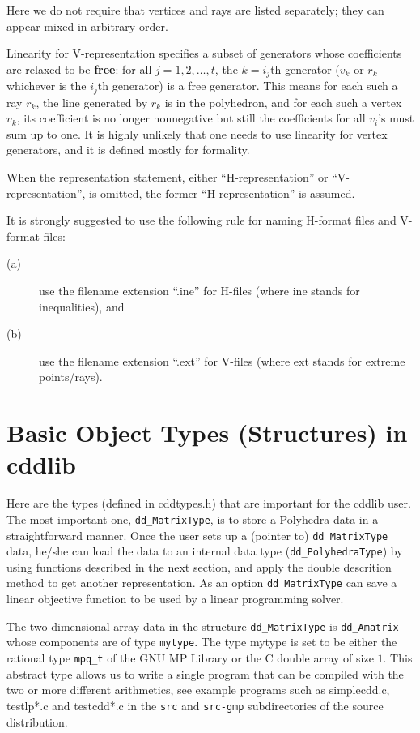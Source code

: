 \documentclass[11pt]{article}
\newcommand {\0} {{\bf 0}}
\begin{document}
\bigskip
\noindent
Here we do not require that
vertices and rays are listed
separately; they can appear mixed in arbitrary
order.

Linearity for V-representation specifies a subset of generators
whose coefficients are relaxed
to be {\bf free}:  for all $j=1,2, \ldots, t$, the $k=i_j$th generator ($v_{k}$ or $r_k$ whichever is the $i_j$th generator) is a free generator.
This means for each such a ray $r_k$,
the line generated by $r_k$ is in the polyhedron,
and for each such a vertex $v_k$, its coefficient is no longer nonnegative
but still the coefficients for all $v_i$'s must sum up to one.
It is highly unlikely that one needs to
use linearity for vertex generators, and it is defined mostly
for formality.

When the representation statement, either ``H-representation''
or ``V-representation'', is omitted, the former
``H-representation'' is assumed.

It is strongly suggested to use the following rule for naming
H-format files and V-format files:
\begin{description}
\item[(a)] use the filename  extension ``.ine'' for H-files (where ine stands for inequalities), and
\item[(b)]  use the filename  extension ``.ext'' for V-files (where ext stands for extreme points/rays).
\end{description}


\section{Basic Object Types (Structures) in cddlib}  \label{DATASTR}

Here are the types (defined in cddtypes.h) that are
important for the cddlib user.  The most important one,
{\tt dd\_MatrixType},
is to store a Polyhedra data in a straightforward manner.
Once the user sets up a (pointer to)  {\tt dd\_MatrixType} data,
he/she can load the data to an internal data type ({\tt dd\_PolyhedraType})
by using functions described in the next section, and apply
the double descrition method to get another representation.
As an option  {\tt dd\_MatrixType} can save a linear objective function
to be used by a linear programming solver.

The two dimensional array data in the structure {\tt dd\_MatrixType} is
{\tt dd\_Amatrix} whose components are of type {\tt mytype\/}.
The type mytype is set to be either the rational type {\tt mpq\_t} of
the GNU MP Library or the C double array of size $1$.
This abstract type allows us to write a single program that can
be compiled with the two or more different arithmetics, see example
programs such as simplecdd.c, testlp*.c and testcdd*.c
in the {\tt src} and {\tt src-gmp} subdirectories of the source
distribution.
\end{document}
